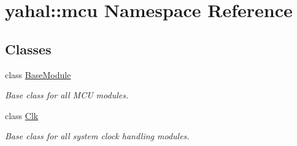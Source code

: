 \hypertarget{namespaceyahal_1_1mcu}{}\section{yahal\+:\+:mcu Namespace Reference}
\label{namespaceyahal_1_1mcu}
\subsection*{Classes}
\begin{DoxyCompactItemize}
\item 
class \hyperlink{classyahal_1_1mcu_1_1_base_module}{Base\+Module}
\begin{DoxyCompactList}\small\item\em Base class for all M\+C\+U modules. \end{DoxyCompactList}\item 
class \hyperlink{classyahal_1_1mcu_1_1_clk}{Clk}
\begin{DoxyCompactList}\small\item\em Base class for all system clock handling modules. \end{DoxyCompactList}\end{DoxyCompactItemize}

